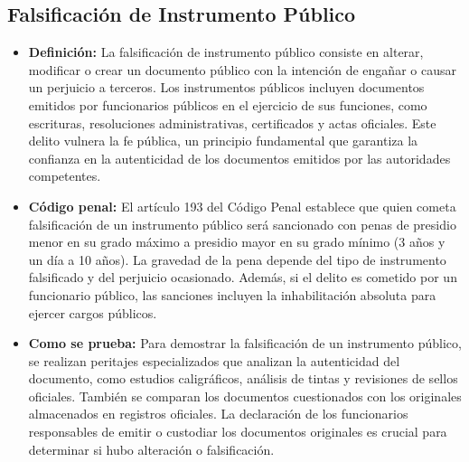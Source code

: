 \documentclass[letter,12pt]{article}
\begin{document}
	\subsection{Falsificación de Instrumento Público}
	\begin{itemize}
		\item \textbf{Definición: }La falsificación de instrumento público consiste en alterar, modificar o crear un documento público con la intención de engañar o causar un perjuicio a terceros. Los instrumentos públicos incluyen documentos emitidos por funcionarios públicos en el ejercicio de sus funciones, como escrituras, resoluciones administrativas, certificados y actas oficiales. Este delito vulnera la fe pública, un principio fundamental que garantiza la confianza en la autenticidad de los documentos emitidos por las autoridades competentes.\\
		
		\item \textbf{Código penal: }El artículo 193 del Código Penal establece que quien cometa falsificación de un instrumento público será sancionado con penas de presidio menor en su grado máximo a presidio mayor en su grado mínimo (3 años y un día a 10 años). La gravedad de la pena depende del tipo de instrumento falsificado y del perjuicio ocasionado. Además, si el delito es cometido por un funcionario público, las sanciones incluyen la inhabilitación absoluta para ejercer cargos públicos.\\
		
		\item \textbf{Como se prueba: }Para demostrar la falsificación de un instrumento público, se realizan peritajes especializados que analizan la autenticidad del documento, como estudios caligráficos, análisis de tintas y revisiones de sellos oficiales. También se comparan los documentos cuestionados con los originales almacenados en registros oficiales. La declaración de los funcionarios responsables de emitir o custodiar los documentos originales es crucial para determinar si hubo alteración o falsificación.\\
		

\end{itemize}
\end{document}
